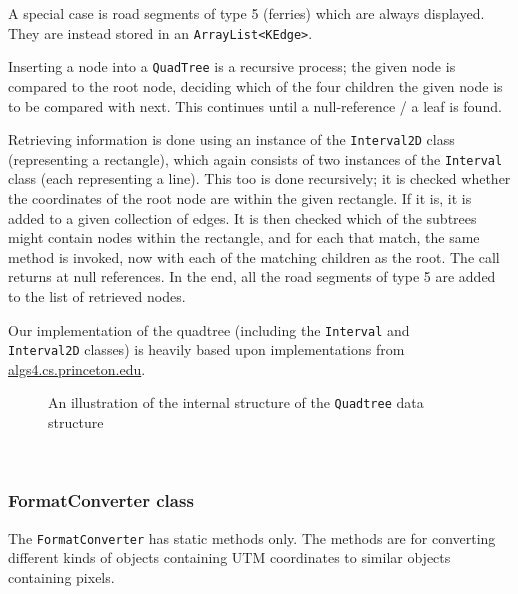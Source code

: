 A special case is road segments of type 5 (ferries) which are always displayed. They are instead stored in an \texttt{ArrayList<KEdge>}.

Inserting a node into a \texttt{QuadTree} is a recursive process; the given node is compared to the root node, deciding which of the four children the given node is to be compared with next. This continues until a null-reference / a leaf is found.

Retrieving information is done using an instance of the \texttt{Interval2D} class (representing a rectangle), which again consists of two instances of the \texttt{Interval} class (each representing a line). This too is done recursively; it is checked whether the coordinates of the root node are within the given rectangle. If it is, it is added to a given collection of edges. It is then checked which of the subtrees might contain nodes within the rectangle, and for each that match, the same method is invoked, now with each of the matching children as the root. The call returns at null references. In the end, all the road segments of type 5 are added to the list of retrieved nodes.

Our implementation of the quadtree (including the \texttt{Interval} and \\ \texttt{Interval2D} classes) is heavily based upon implementations from \url{algs4.cs.princeton.edu}.
\\
\begin{figure}[!h]
\centering
{}
	\caption{An illustration of the internal structure of the \texttt{Quadtree} data structure}
\end{figure}
\\
\subsubsection{FormatConverter class} %
The \texttt{FormatConverter} has static methods only. The methods are for converting different kinds of objects containing UTM coordinates to similar objects containing pixels.

